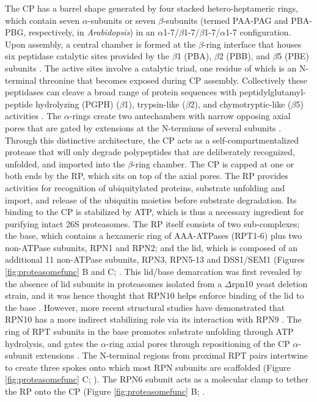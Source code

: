 	 The CP has a barrel shape generated by four stacked hetero-heptameric rings, which contain seven $\alpha$-subunits or seven $\beta$-subunits (termed PAA-PAG and PBA-PBG, respectively, in \textit{Arabidopsis}) in an $\alpha$1-7/$\beta$1-7/$\beta$1-7/$\alpha$1-7 configuration.  Upon assembly, a central chamber is formed at the $\beta$-ring interface that houses six peptidase catalytic sites provided by the $\beta$1 (PBA), $\beta$2 (PBB), and $\beta$5 (PBE) subunits \citep{arendt97, heinemeyer97}.  The active sites involve a catalytic triad, one residue of which is an N-terminal threonine that becomes exposed during CP assembly.  Collectively these peptidases can cleave a broad range of protein sequences with peptidylglutamyl-peptide hydrolyzing (PGPH) ($\beta$1), trypsin-like ($\beta$2), and chymotryptic-like ($\beta$5) activities  \citep{arendt97, groll99}.  The $\alpha$-rings create two antechambers with narrow opposing axial pores that are gated by extensions at the N-terminus of several subunits \citep{groll00, ruschak10}.  Through this distinctive architecture, the CP acts as a self-compartmentalized protease that will only degrade polypeptides that are deliberately recognized, unfolded, and imported into the $\beta$-ring chamber. 
	The CP is capped at one or both ends by the RP, which sits on top of the axial pores.  The RP provides activities for recognition of ubiquitylated proteins, substrate unfolding and import, and release of the ubiquitin moieties before substrate degradation.  Its binding to the CP is stabilized by ATP, which is thus a necessary ingredient for purifying intact 26S proteasomes.  The RP itself consists of two sub-complexes; the base, which contains a hexameric ring of AAA-ATPases (RPT1-6) plus two non-ATPase subunits, RPN1 and RPN2; and the lid, which is composed of an additional 11 non-ATPase subunits, RPN3, RPN5-13 and DSS1/SEM1 (Figures \ref{fig:proteasomefunc} B and C; \citep{bhattacharyya14, book10, finley09, glickman98-c8Wsa, russell13}.  This lid/base demarcation was first revealed by the absence of lid subunits in proteasomes isolated from a $\Delta$rpn10 yeast deletion strain, and it was hence thought that RPN10 helps enforce binding of the lid to the base \citep{glickman98}.  However, more recent structural studies have demonstrated that RPN10 has a more indirect stabilizing role via its interaction with RPN9 \citep{lander12}.  The ring of RPT subunits in the base promotes substrate unfolding through ATP hydrolysis, and gates the $\alpha$-ring axial pores through repositioning of the CP $\alpha$-subunit extensions \citep{köhler01, rabl08, smith05}.  The N-terminal regions from proximal RPT pairs intertwine to create three spokes onto which most RPN subunits are scaffolded (Figure \ref{fig:proteasomefunc} C; \citep{beck12}).  The RPN6 subunit acts as a molecular clamp to tether the RP onto the CP (Figure \ref{fig:proteasomefunc} B; \citep{pathare12}. 


